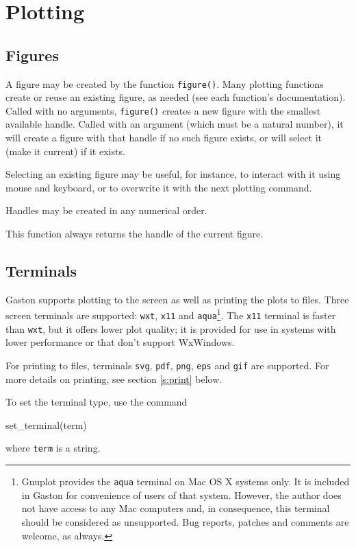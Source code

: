 \documentclass[11pt]{article}
\newcommand{\cmd}[1]{\texttt{#1}}
\begin{document}
\section{Plotting}
\label{hilevel}

\subsection{Figures}

A figure may be created by the function \cmd{figure()}. Many plotting functions
create or reuse an existing figure, as needed (see each function's
documentation). Called with no arguments, \cmd{figure()} creates a new figure
with the smallest available handle. Called with an argument (which must be a
natural number), it will create a figure with that handle if no such figure
exists, or will select it (make it current) if it exists.

Selecting an existing figure may be useful, for instance, to interact with it
using mouse and keyboard, or to overwrite it with the next plotting command.

Handles may be created in any numerical order.

This function always returns the handle of the current figure.

\subsection{Terminals}

Gaston supports plotting to the screen as well as printing the plots to files.
Three screen terminals are supported: \cmd{wxt}, \cmd{x11} and
\cmd{aqua}\footnote{Gnuplot provides the \cmd{aqua} terminal on Mac OS X
systems only. It is included in Gaston for convenience of users of that system.
However, the author does not have access to any Mac computers and, in
consequence, this terminal should be considered as unsupported. Bug reports,
patches and comments are welcome, as always.}. The \cmd{x11} terminal is faster
than \cmd{wxt}, but it offers lower plot quality; it is provided for use in
systems with lower performance or that don't support WxWindows.

For printing to files, terminals \cmd{svg}, \cmd{pdf}, \cmd{png}, \cmd{eps} and
\cmd{gif} are supported. For more details on printing, see section
\ref{s:print} below.

To set the terminal type, use the command
\begin{juliacode}
set_terminal(term)
\end{juliacode}
where \cmd{term} is a string.
\end{document}
